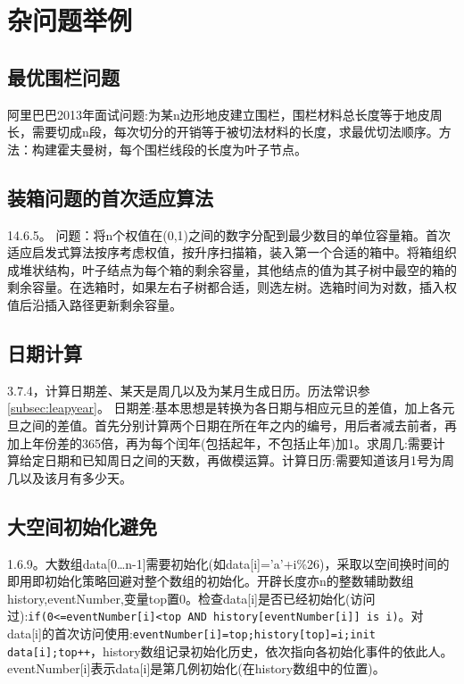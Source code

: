 
\section{杂问题举例}

\subsection{最优围栏问题}
阿里巴巴2013年面试问题:为某n边形地皮建立围栏，围栏材料总长度等于地皮周长，需要切成n段，每次切分的开销等于被切法材料的长度，求最优切法顺序。方法：构建霍夫曼树，每个围栏线段的长度为叶子节点。

\subsection{装箱问题的首次适应算法}
\cite{pp}14.6.5。
问题：将n个权值在(0,1)之间的数字分配到最少数目的单位容量箱。首次适应启发式算法按序考虑权值，按升序扫描箱，装入第一个合适的箱中。将箱组织成堆状结构，叶子结点为每个箱的剩余容量，其他结点的值为其子树中最空的箱的剩余容量。在选箱时，如果左右子树都合适，则选左树。选箱时间为对数，插入权值后沿插入路径更新剩余容量。

\subsection{日期计算}
\cite{pp}3.7.4，计算日期差、某天是周几以及为某月生成日历。历法常识参\ref{subsec:leapyear}。
日期差:基本思想是转换为各日期与相应元旦的差值，加上各元旦之间的差值。首先分别计算两个日期在所在年之内的编号，用后者减去前者，再加上年份差的365倍，再为每个闰年(包括起年，不包括止年)加1。求周几:需要计算给定日期和已知周日之间的天数，再做模运算。计算日历:需要知道该月1号为周几以及该月有多少天。

\subsection{大空间初始化避免}
\cite{pp}1.6.9。大数组data[0\dots n-1]需要初始化(如data[i]='a'+i\%26)，采取以空间换时间的即用即初始化策略回避对整个数组的初始化。开辟长度亦n的整数辅助数组history,eventNumber,变量top置0。检查data[i]是否已经初始化(访问过):\verb|if(0<=eventNumber[i]<top AND history[eventNumber[i]] is i)|。对data[i]的首次访问使用:\verb|eventNumber[i]=top;history[top]=i;init data[i];top++|，history数组记录初始化历史，依次指向各初始化事件的依此人。eventNumber[i]表示data[i]是第几例初始化(在history数组中的位置)。\label{problem:removeInit}

